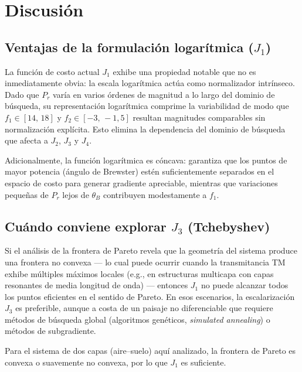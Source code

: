 \documentclass[11pt, a4paper]{article}
\begin{document}
\section{Discusión}

\subsection{Ventajas de la formulación logarítmica (\texorpdfstring{$J_1$}{J1})}

La función de costo actual $J_1$ exhibe una propiedad notable que no es inmediatamente
obvia: la escala logarítmica actúa como normalizador intrínseco. Dado que $P_r$ varía
en varios órdenes de magnitud a lo largo del dominio de búsqueda, su representación
logarítmica comprime la variabilidad de modo que $f_1 \in [14,\,18]$ y
$f_2 \in [-3,\,-1{,}5]$ resultan magnitudes comparables sin normalización explícita.
Esto elimina la dependencia del dominio de búsqueda que afecta a $J_2$, $J_3$ y $J_4$.

Adicionalmente, la función logarítmica es cóncava: garantiza que los puntos de mayor
potencia (ángulo de Brewster) estén suficientemente separados en el espacio de costo
para generar gradiente apreciable, mientras que variaciones pequeñas de $P_r$ lejos
de $\theta_B$ contribuyen modestamente a $f_1$.

\subsection{Cuándo conviene explorar \texorpdfstring{$J_3$}{J3} (Tchebyshev)}

Si el análisis de la frontera de Pareto revela que la geometría del sistema produce
una frontera no convexa — lo cual puede ocurrir cuando la transmitancia TM exhibe
múltiples máximos locales (e.g., en estructuras multicapa con capas resonantes de
media longitud de onda) — entonces $J_1$ no puede alcanzar todos los puntos eficientes
en el sentido de Pareto. En esos escenarios, la escalarización $J_3$ es preferible,
aunque a costa de un paisaje no diferenciable que requiere métodos de búsqueda global
(algoritmos genéticos, \emph{simulated annealing}) o métodos de subgradiente.

Para el sistema de dos capas (aire–suelo) aquí analizado, la frontera de Pareto es
convexa o suavemente no convexa, por lo que $J_1$ es suficiente.
\end{document}
